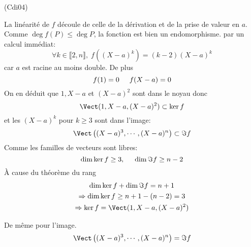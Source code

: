 \begin{tiny}(Cdi04)\end{tiny} La linéarité de $f$ découle de celle de la dérivation et de la prise de valeur en $a$. Comme $\deg f(P) \leq \deg P$, la fonction est bien un endomorphisme. par un calcul immédiat:
\begin{displaymath}
  \forall k\in \llbracket 2,n\rrbracket,\;
  f((X-a)^k) = (k-2)(X-a)^{k}
\end{displaymath}
car $a$ est racine au moins double. De plus
\begin{displaymath}
  f(1) = 0\hspace{0.5cm} f(X-a) = 0
\end{displaymath}
On en déduit que $1, X-a$ et $(X-a)^2$ sont dans le noyau donc
\begin{displaymath}
  \Vect(1,X-a, (X-a)^2)\subset \ker f
\end{displaymath}
et les $(X-a)^k$ pour $k\geq 3$ sont dans l'image:
\begin{displaymath}
\Vect\left( (X-a)^3,\cdots,(X-a)^n\right)
\subset \Im f
\end{displaymath}
Comme les familles de vecteurs sont libres:
\begin{displaymath}
\dim \ker f \geq 3, \hspace{0.5cm}
\dim \Im f \geq n-2
\end{displaymath}
\`A cause du théorème du rang
\begin{multline*}
\dim \ker f + \dim \Im f = n +1 \\
\Rightarrow \dim \ker f \geq n+1-(n-2) = 3 \\
\Rightarrow \ker f = \Vect(1,X-a, (X-a)^2)
\end{multline*}

De même pour l'image.
\begin{displaymath}
\Vect\left( (X-a)^3,\cdots,(X-a)^n\right) = \Im f  
\end{displaymath}
